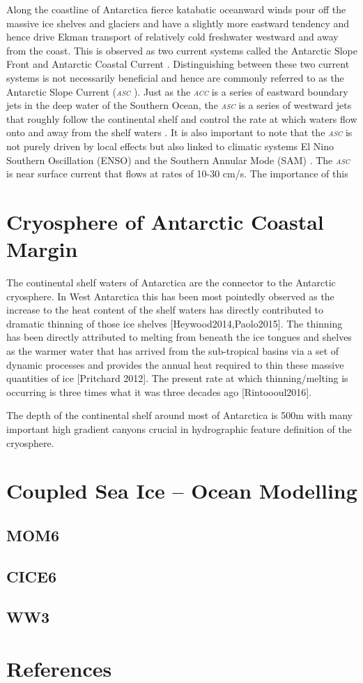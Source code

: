\documentclass[11pt,a4paper]{article}
\newcommand{\asc}{\textit{\textsc{{asc }}}} %
\newcommand{\acc}{\textit{\textsc{{acc }}}} %
\begin{document}
Along the coastline of Antarctica fierce katabatic oceanward winds
pour off the massive ice shelves and glaciers and have a slightly more
eastward tendency and hence drive Ekman transport of relatively cold
freshwater westward and away from the coast. This is observed as two
current systems called the Antarctic Slope Front and Antarctic Coastal
Current \citep{heywoodFateAntarcticSlope2004}. Distinguishing between
these two current systems is not necessarily beneficial and hence are
commonly referred to as the Antarctic Slope Current (\asc). Just as the \acc is a
series of eastward boundary jets in the deep water of the Southern Ocean, the
\asc is a series of westward jets that roughly follow the
continental shelf and control the rate at which waters flow onto and
away from the shelf waters \citep{thompsonAntarcticSlopeCurrent2018}. It is also important to
note that the \asc is not purely driven by local effects but also
linked to climatic systems El Nino Southern Oscillation (ENSO) and the
Southern Annular Mode (SAM) \citep{spenceRapidSubsurfaceWarming2014,nakayamaOriginCircumpolarDeep2018}. The \asc is
near surface current that flows at rates of 10-30 cm/s. The importance
of this 

\section{Cryosphere of Antarctic Coastal Margin}
\label{sec:orgd44eac0}

The continental shelf waters of Antarctica are the connector to the
Antarctic cryosphere. In West Antarctica this has been most pointedly
observed as the increase to the heat
content of the shelf waters has directly contributed to dramatic
thinning of those ice shelves [Heywood2014,Paolo2015]. The thinning
has been directly attributed to melting from beneath the ice tongues
and shelves as the warmer water that has arrived from the sub-tropical
basins via a set of dynamic processes and provides the annual heat required
to thin these massive quantities of ice [Pritchard 2012]. The present rate at
which thinning/melting is occurring is three times what it was three
decades ago [Rintoooul2016].

The depth of the continental shelf around most of Antarctica is 500m
with many important high gradient canyons crucial in hydrographic
feature definition of the cryosphere. 

\section{Coupled Sea Ice -- Ocean Modelling}
\label{sec:org78c8aa5}
\subsection{MOM6}
\label{sec:orgc756a05}
\subsection{CICE6}
\label{sec:org45f334b}
\subsection{WW3}
\label{sec:orgf19bf03}
\section{References}
\label{sec:org63c804b}
\printbibliography[heading=none]
\end{document}
